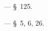\begin{lab:literature}
	\item \SivuhinIII~--- \S~125.

	\item \Kalashnikov~--- \S~5, 6, 26.

\end{lab:literature}

